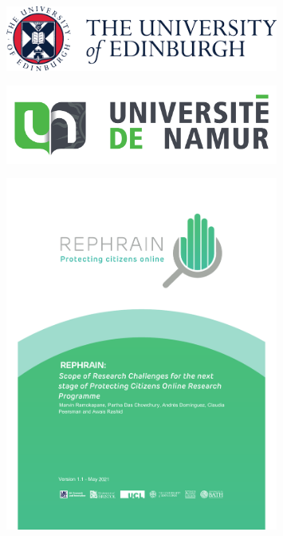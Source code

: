 \documentclass[final]{beamer}
\newlength{\rightcolwidth}
\begin{document}
\begin{frame}[t]
\begin{columns}[t]
\begin{column}{\rightcolwidth}
  
  
 \begin{minipage}[t]{0.32\rightcolwidth}
   \begin{figure}
   \centering
    \includegraphics[width=0.8\textwidth]{images/UoE-logo.png}
  \end{figure}
  \end{minipage}
  \hfil
  \begin{minipage}[t]{0.32\rightcolwidth}

  \begin{figure}
    \centering
    \includegraphics[width=0.8\textwidth]{images/unamur-logo.jpeg}
  \end{figure}
  \end{minipage}
  \hfill
  \begin{minipage}[t]{0.33\rightcolwidth}
\vspace{-1cm}
   \begin{figure}
     \centering
      \includegraphics[width=0.8\textwidth]{images/REPHRAIN-logo.pdf}
  \end{figure}
  \end{minipage}



\end{column}
\end{columns}
\end{frame}
\end{document}
